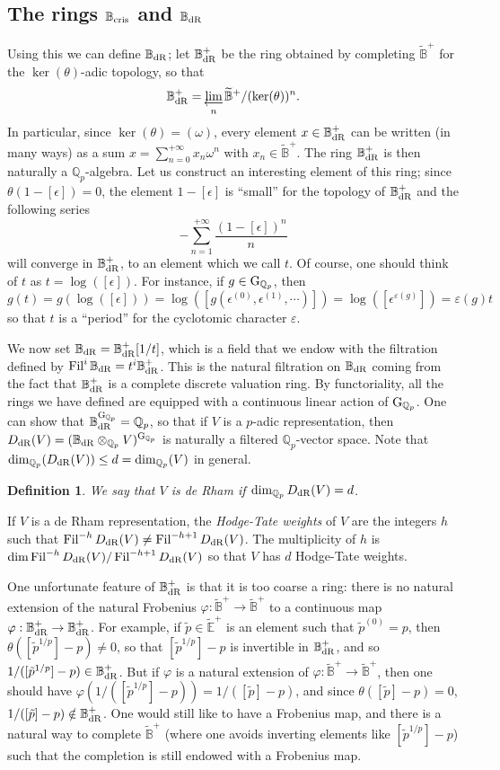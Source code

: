 \documentclass[11pt]{amsart}
\def\limproj{\mathop{\oalign{{\rm lim}\cr 
\hidewidth$\longleftarrow$\hidewidth\cr}}}
\def\Q{{\mathbb Q}_p}
\def\g{{\rm G}_{\Q}}
\def\ra{\rightarrow}
\def\Qp{{\mathbb Q}_p}
\def\eps{\varepsilon}
\def\btplus{\widetilde{\mathbb{B}}^+}
\def\etplus{\widetilde{\mathbb{E}}^+}
\def\bcris{\mathbb{B}_{\rm cris}}
\def\bdR{\mathbb{B}_{\rm dR}}
\def\ddR{D_{\rm dR}}
\def\on{\operatorname}
\newtheorem{definit}{\bf{Definition}}[subsection]
\begin{document}
\subsection{The rings $\bcris$ and $\bdR$}\label{2.2} 
Using this we can define $\bdR$;  
let $\bdR^+$ be the ring obtained by completing 
$\btplus$ for the $\ker(\theta)$-adic topology, so that 
\[ \bdR^+=\limproj_n \btplus / (\ker(\theta))^n. \]  
In particular, since $\ker(\theta)=(\omega)$, 
every element $x \in \bdR^+$ 
can be written (in many ways) as a sum $x=\sum_{n=0}^{+\infty} x_n \omega^n$ with $x_n \in 
\btplus$.  
The ring $\bdR^+$ is then naturally a $\Q$-algebra.  
Let us construct an interesting 
element of this ring; since $\theta(1-[\epsilon])=0$, the element 
$1-[\epsilon]$ is ``small''  
for the topology of $\bdR^+$ and the 
following series \[ -\sum_{n = 1}^{+\infty} \frac{(1-[\epsilon])^n}{n} \] will converge in 
$\bdR^+$, to an element which we call $t$. Of course, one should think of $t$ as 
$t=\log([\epsilon])$.  
For instance, if $g \in \g$, then  
\[ g(t)=g(\log([\epsilon]))=\log([g(\epsilon^{(0)},\epsilon^{(1)},\cdots)])= 
\log([\epsilon^{\eps(g)}])=\eps(g)t \] 
so that $t$ is a ``period'' for the cyclotomic character $\eps$.   
 
We now set $\bdR=\bdR^+[1/t]$, which is a field that  
we endow with the filtration defined by $\on{Fil}^i \bdR = t^i 
\bdR^+$. This is the natural filtration on $\bdR$ coming from the fact 
that $\bdR^+$ is a complete discrete valuation ring. 
By functoriality, all the rings we have defined are equipped with a continuous 
linear action of $\g$. One can show that $\bdR^{\g}=\Q$,  
so that if $V$ is a $p$-adic 
representation, then $\ddR(V)=(\bdR \otimes_{\Qp} V)^{\g}$ is naturally a  
filtered $\Q$-vector space.  
Note that $\dim_{\Q} (\ddR(V)) \leq d = \dim_{\Qp}(V)$ in general. 
\begin{definit}\label{defdr} 
We say that $V$ is  
\emph{de Rham} if $\dim_{\Q} \ddR(V) = d$. 
\end{definit} 
 
If $V$ is a de Rham representation, the \emph{Hodge-Tate weights} of 
$V$ are the integers $h$ such that $\on{Fil}^{-h} \ddR(V) \neq 
\on{Fil}^{-h+1} \ddR(V)$. The multiplicity of $h$  
is $\dim \on{Fil}^{-h} \ddR(V) / 
\on{Fil}^{-h+1} \ddR(V)$ so that $V$ has $d$ Hodge-Tate weights. 
 
One unfortunate feature of $\bdR^+$ is that it is too coarse a ring: there is 
no natural extension of the natural Frobenius 
$\varphi:\btplus \ra \btplus$ to a continuous map $\varphi: \bdR^+ \ra 
\bdR^+$. For example,  
if $\tilde{p} \in \etplus$ is an element such that 
$\tilde{p}^{(0)}=p$, then 
$\theta([\tilde{p}^{1/p}]-p) \neq 0$, so that  
$[\tilde{p}^{1/p}]-p$ is invertible in $\bdR^+$, and so $1/([\tilde{p}^{1/p}]-p) \in 
\bdR^+$. But if 
$\varphi$ is a natural extension of   
$\varphi:\btplus \ra \btplus$, then one should have 
$\varphi(1/([\tilde{p}^{1/p}]-p))=1/([\tilde{p}]-p)$, and since $\theta([\tilde{p}]-p)=0$,  
$1/([\tilde{p}]-p) \notin \bdR^+$.  
One would still like to have a Frobenius map, and there is a natural 
way to complete $\btplus$ (where one avoids inverting 
elements like $[\tilde{p}^{1/p}]-p$) such that the completion is still 
endowed with a Frobenius map. 
 
\end{document}
